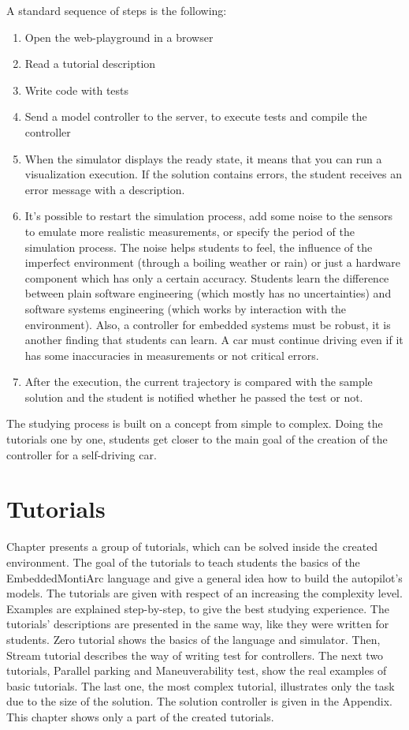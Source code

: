 A standard sequence of steps is the following:
\begin{enumerate}
    \item Open the web-playground in a browser
    \item Read a tutorial description
    \item Write code with tests
    \item Send a model controller to the server, to execute tests and compile the controller
    \item When the simulator displays the ready state, it means that you can run a visualization execution. If the solution contains errors, the student receives an error message with a description.
    \item It's possible to restart the simulation process, add some noise to the sensors to emulate more realistic measurements, or specify the period of the simulation process. The noise helps students to feel, the influence of the imperfect environment (through a boiling weather or rain) or just a hardware component which has only a certain accuracy. Students learn the difference between plain software engineering (which mostly has no uncertainties) and software systems engineering (which works by interaction with the environment). Also, a controller for embedded systems must be robust, it is another finding that students can learn. A car must continue driving even if it has some inaccuracies in measurements or not critical errors.
    \item After the execution, the current trajectory is compared with the sample solution and the student is notified whether he passed the test or not.
\end{enumerate}
The studying process is built on a concept from simple to complex. Doing the tutorials one by one, students get closer to the main goal of the creation of the controller for a self-driving car.

\chapter{Tutorials} \label{sec:tutorials}
Chapter presents a group of tutorials, which can be solved inside the created environment. The goal of the tutorials to teach students the basics of the EmbeddedMontiArc language and give a general idea how to build the autopilot's models. The tutorials are given with respect of an increasing the complexity level. Examples are explained step-by-step, to give the best studying experience. The tutorials' descriptions are presented in the same way, like they were written for students. Zero tutorial shows the basics of the language and simulator. Then, Stream tutorial describes the way of writing test for controllers. The next two tutorials, Parallel parking and Maneuverability test, show the real examples of basic tutorials. The last one, the most complex tutorial, illustrates only the task due to the size of the solution. The solution controller is given in the Appendix. This chapter shows only a part of the created tutorials.

